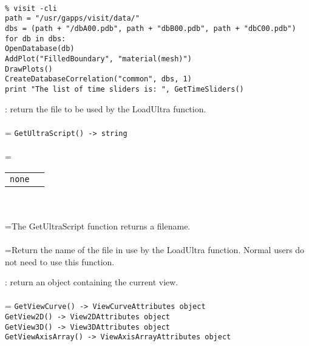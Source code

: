 \documentclass[10pt,a4paper]{report}
\begin{document}
\\[-6mm]
\begin{verbatim}% visit -cli
path = "/usr/gapps/visit/data/"
dbs = (path + "/dbA00.pdb", path + "dbB00.pdb", path + "dbC00.pdb")
for db in dbs:
OpenDatabase(db)
AddPlot("FilledBoundary", "material(mesh)")
DrawPlots()
CreateDatabaseCorrelation("common", dbs, 1)
print "The list of time sliders is: ", GetTimeSliders()
\end{verbatim}
\newpage


{}
: return the file to be used by the LoadUltra function.\\[-3mm]

 \\ 
\hangindent=\parindent 
\verb!GetUltraScript() -> string!\\ [-3mm]

 \\ 
\hangindent=\parindent 
\begin{tabular}{ll}
\verb!none! &  \\
\end{tabular} \\[-2mm]


 \\ 
\hangindent=\parindent The GetUltraScript function returns a filename. \\[-3mm] 

 \\ 
\hangindent=\parindent Return the name of the file in use by the LoadUltra function. Normal users do not need to use this function. \\[-3mm] 

\newpage


{}
: return an object containing the current view.\\[-3mm]

 \\ 
\hangindent=\parindent 
\verb!GetViewCurve() -> ViewCurveAttributes object!\\ 
\verb!GetView2D() -> View2DAttributes object!\\ 
\verb!GetView3D() -> View3DAttributes object!\\ 
\verb!GetViewAxisArray() -> ViewAxisArrayAttributes object!\\ [-3mm]
\end{document}
